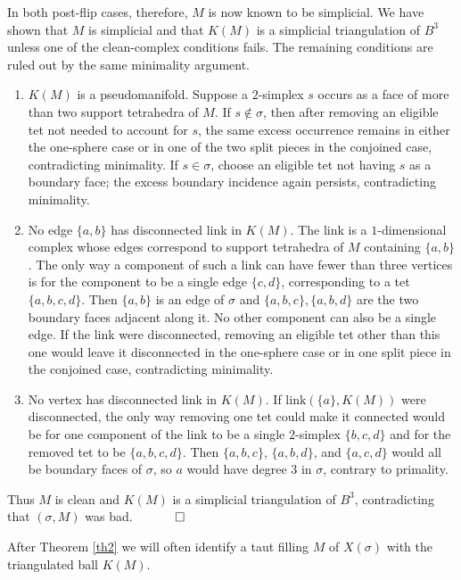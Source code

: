 \documentclass[12pt]{article}
\newcommand{\proofend}{$\quad \qed$}
\newcommand{\kw}{\mathrm}
\newcommand{\link}{\kw{link}}
\begin{document}
In both post-flip cases, therefore, $M$ is now known to be simplicial.
We have shown that $M$ is simplicial and that $K(M)$ is a simplicial
triangulation of $B^3$ unless one of the clean-complex conditions fails.
The remaining conditions are ruled out by the same minimality argument.

\begin{enumerate}
\item
$K(M)$ is a pseudomanifold.
Suppose a $2$-simplex $s$ occurs as a face of more than two support
tetrahedra of $M$.
If $s \notin \sigma$, then after removing an eligible tet not needed to
account for $s$, the same excess occurrence remains in either the
one-sphere case or in one of the two split pieces in the conjoined case,
contradicting minimality.
If $s \in \sigma$, choose an eligible tet not having $s$ as a boundary
face; the excess boundary incidence again persists, contradicting
minimality.

\item
No edge $\{a,b\}$ has disconnected link in $K(M)$.
The link is a $1$-dimensional complex whose edges correspond to support
tetrahedra of $M$ containing $\{a,b\}$.
The only way a component of such a link can have fewer than three
vertices is for the component to be a single edge $\{c,d\}$,
corresponding to a tet $\{a,b,c,d\}$.
Then $\{a,b\}$ is an edge of $\sigma$ and
$\{a,b,c\},\{a,b,d\}$ are the two boundary faces adjacent along it.
No other component can also be a single edge.
If the link were disconnected, removing an eligible tet other than this
one would leave it disconnected in the one-sphere case or in one split
piece in the conjoined case, contradicting minimality.

\item
No vertex has disconnected link in $K(M)$.
If $\link(\{a\},K(M))$ were disconnected, the only way removing one tet
could make it connected would be for one component of the link to be a
single $2$-simplex $\{b,c,d\}$ and for the removed tet to be
$\{a,b,c,d\}$.
Then $\{a,b,c\}$, $\{a,b,d\}$, and $\{a,c,d\}$ would all be boundary
faces of $\sigma$, so $a$ would have degree $3$ in $\sigma$, contrary to
primality.
\end{enumerate}

Thus $M$ is clean and $K(M)$ is a simplicial triangulation of $B^3$,
contradicting that $(\sigma,M)$ was bad.
\proofend

After Theorem \ref{th2} we will often identify a taut filling $M$ of
$X(\sigma)$ with the triangulated ball $K(M)$.
\end{document}
